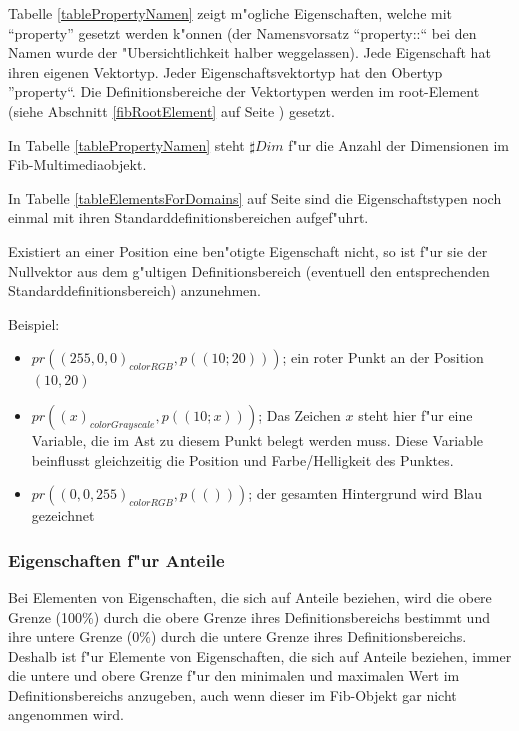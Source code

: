 Tabelle \ref{tablePropertyNamen} zeigt m"ogliche Eigenschaften, welche mit ``property'' gesetzt werden k"onnen (der Namensvorsatz ``property::`` bei den Namen wurde der "Ubersichtlichkeit halber weggelassen). Jede Eigenschaft hat ihren eigenen Vektortyp. Jeder Eigenschaftsvektortyp hat den Obertyp ''property``. Die Definitionsbereiche der Vektortypen werden im root-Element (siehe Abschnitt \ref{fibRootElement} auf Seite \pageref{fibRootElement}) gesetzt.

In Tabelle \ref{tablePropertyNamen} steht $\sharp Dim$ f"ur die Anzahl der Dimensionen im Fib-Multi\-media\-objekt.

In Tabelle \ref{tableElementsForDomains} auf Seite \pageref{tableElementsForDomains} sind die Eigenschaftstypen noch einmal mit ihren Standarddefinitionsbereichen aufgef"uhrt.

Existiert an einer Position eine ben"otigte Eigenschaft nicht, so ist f"ur sie der Nullvektor aus dem g"ultigen Definitionsbereich (eventuell den entsprechenden Standarddefinitionsbereich) anzunehmen.

\bigskip\noindent
Beispiel:
\begin{itemize}
 \item $pr( (255, 0, 0)_{colorRGB}, p((10;20)) )$; ein roter Punkt an der Position $(10, 20)$
 \item $pr( (x)_{colorGrayscale}, p((10;x)) )$; Das Zeichen $x$ steht hier f"ur eine Variable, die im Ast zu diesem Punkt belegt werden muss. Diese Variable beinflusst gleichzeitig die Position und Farbe/Helligkeit des Punktes.
 \item $pr( ( 0, 0, 255)_{colorRGB}, p(()) )$; der gesamten Hintergrund wird Blau gezeichnet
\end{itemize}


\subsubsection{Eigenschaften f"ur Anteile}

Bei Elementen von Eigenschaften, die sich auf Anteile beziehen, wird die obere Grenze (100\%) durch die obere Grenze ihres Definitionsbereichs bestimmt und ihre untere Grenze (0\%) durch die untere Grenze ihres Definitionsbereichs. Deshalb ist f"ur Elemente von Eigenschaften, die sich auf Anteile beziehen, immer die untere und obere Grenze f"ur den minimalen und maximalen Wert im Definitionsbereichs anzugeben, auch wenn dieser im Fib-Objekt gar nicht angenommen wird.


